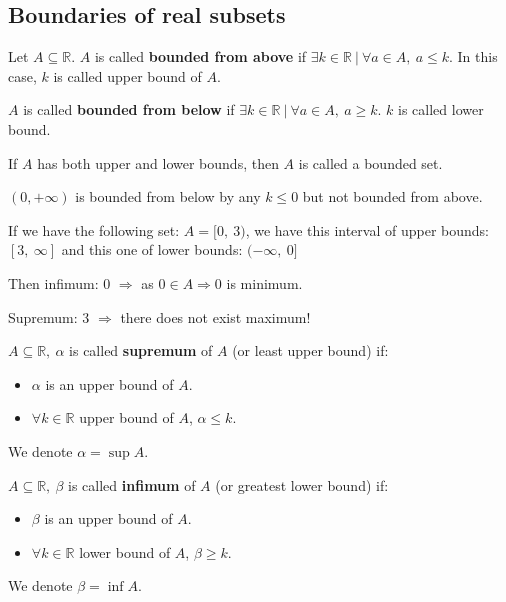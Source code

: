 \documentclass[12pt, a4paper]{book}
\begin{document}
\subsection*{Boundaries of real subsets}
\boldmath
\begin{defn}
  Let $A \subseteq \mathbb{R}$. $A$ is called \textbf{bounded from above} if $\exists k\in\mathbb{R}\ |\ \forall a\in A,\ a\leq k$. In this case, $k$ is called upper bound of $A$.

  $A$ is called \textbf{bounded from below} if $\exists k\in\mathbb{R}\ |\ \forall a\in A,\ a\geq k$. $k$ is called lower bound.

  If $A$ has both upper and lower bounds, then $A$ is called a bounded set.
\end{defn}
\unboldmath

\begin{exmp}
  $(0,+\infty)$ is bounded from below by any $k \leq 0$ but not bounded from above.
\end{exmp}

\begin{exmp}
  If we have the following set: $A=[0, \ 3)$, we have this interval of upper bounds: $[3, \ \infty]$ and this one of lower bounds: $(-\infty,\ 0]$

  Then infimum: 0 $\Rightarrow$ as $0 \in A \Rightarrow 0$ is minimum.

  Supremum: 3 $\Rightarrow$ there does not exist maximum!
\end{exmp}

\begin{defn}
  $A \subseteq \mathbb{R},\ \alpha$ is called \textbf{supremum} of $A$ (or least upper bound) if:
  \begin{itemize}
    \item $\alpha$ is an upper bound of $A$.
    \item $\forall k\in\mathbb{R}$ upper bound of $A$, $\alpha \leq k$.
  \end{itemize}
  We denote $\alpha = \sup A$.
\end{defn}

\begin{defn}
  $A \subseteq \mathbb{R},\ \beta$ is called \textbf{infimum} of $A$ (or greatest lower bound) if:
  \begin{itemize}
    \item $\beta$ is an upper bound of $A$.
    \item $\forall k\in\mathbb{R}$ lower bound of $A$, $\beta \geq k$.
  \end{itemize}
  We denote $\beta = \inf A$.
\end{defn}
\end{document}
